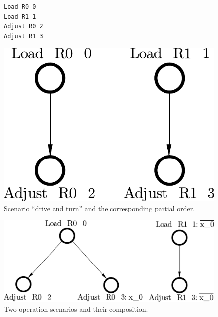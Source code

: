 \begin{figure}[H]
\vspace{-5mm}
\centering
  \begin{minipage}[b]{0.5\textwidth}
\begin{verbatim}
Load R0 0
Load R1 1
Adjust R0 2
Adjust R1 3
\end{verbatim}
\vspace{3mm}
\end{minipage}
\begin{minipage}[b]{0.4\textwidth}
\includegraphics[scale=0.35]{img/ataed-scenario-turn.pdf}
\end{minipage}
\vspace{-3mm}
\caption{Scenario ``drive and turn'' and the corresponding
partial order.\label{fig-scenarios-turn}}
\vspace{-9mm}
\end{figure}


\begin{figure}[H]
\vspace{-5mm}
\centerline{\includegraphics[scale=0.35]{img/ataed-composition.pdf}}
\vspace{-4mm}
\caption{Two operation scenarios and their composition.\label{fig-scenarios-composition}}
\vspace{-7mm}
\end{figure}

